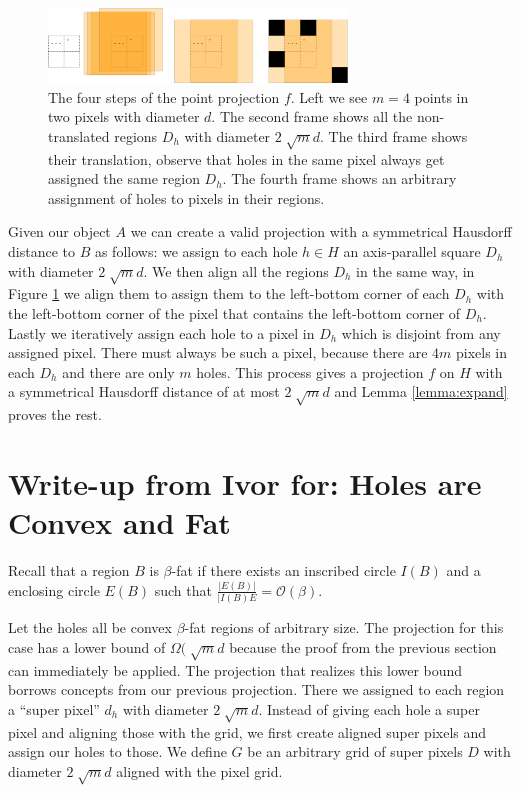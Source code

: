 \documentclass[a4paper, UKenglish]{lipics-v2018}
\begin{document}
\begin{figure}[H]
\centering
\includegraphics[width=300px]{Figures/pointprojection.png}
\caption{The four steps of the point projection $f$. Left we see $m=4$ points in two pixels with diameter $d$. The second frame shows all the non-translated regions $D_h$ with diameter $2\sqrt[]{m}d$. The third frame shows their translation, observe that holes in the same pixel always get assigned the same region $D_h$. The fourth frame shows an arbitrary assignment of holes to pixels in their regions.}
\label{fig:pointprojection}
\end{figure}


Given our object $A$ we can create a valid projection with a symmetrical Hausdorff distance to $B$ as follows: we assign to each hole $h \in H$ an axis-parallel square $D_h$ with diameter $2\sqrt[]{m}d$. We then align all the regions $D_h$ in the same way, in Figure \ref{fig:pointprojection} we align them to assign them to the left-bottom corner of each $D_h$ with the left-bottom corner of the pixel that contains the left-bottom corner of $D_h$. Lastly we iteratively assign each hole to a pixel in $D_h$ which is disjoint from any assigned pixel. There must always be such a pixel, because there are $4m$ pixels in each $D_h$ and there are only $m$ holes. This process gives a projection $f$ on $H$ with a symmetrical Hausdorff distance of at most $2\sqrt[]{m}d$ and Lemma \ref{lemma:expand} proves the rest.



\section{Write-up from Ivor for: Holes are Convex and Fat}



Recall that a region $B$ is $\beta$-fat if there exists an inscribed circle $I(B)$ and a enclosing circle $E(B)$ such that $\frac{|E(B)|}{|I(B)E} = \mathcal{O}(\beta)$.

Let the holes all be convex $\beta$-fat regions of arbitrary size. The projection for this case has a lower bound of $\Omega(\sqrt[]{m}d$ because the proof from the previous section can immediately be applied. The projection that realizes this lower bound borrows concepts from our previous projection. There we assigned to each region a ``super pixel'' $d_h$ with diameter $2\sqrt[]{m}d$. Instead of giving each hole a super pixel and aligning those with the grid, we first create aligned super pixels and assign our holes to those. We define $G$ be an arbitrary grid of super pixels $D$ with diameter $2\sqrt[]{m}d$ aligned with the pixel grid. 
\end{document}

